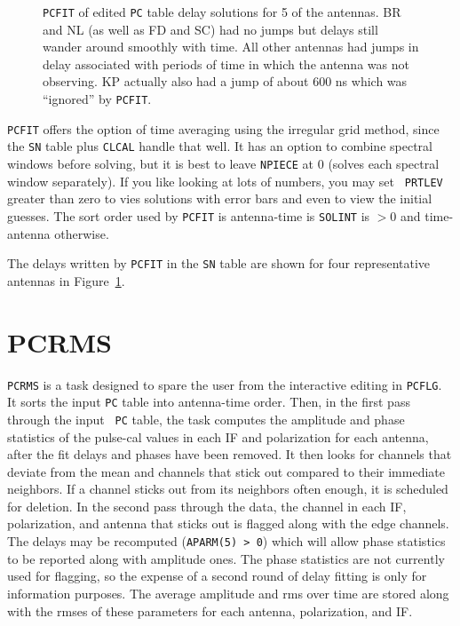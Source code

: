 \documentclass[twoside]{article}
\newcommand{\putfig}[1]{\texttt{[image: \#1.eps]}}
\begin{document}
\begin{figure}
\begin{center}
\resizebox{6.5in}{!}{\putfig{PCFIT}}
\caption{{\tt PCFIT} of edited {\tt PC} table delay solutions for 5 of
  the antennas.  BR and NL (as well as FD and SC) had no jumps but
  delays still wander around smoothly with time.  All other antennas
  had jumps in delay associated with periods of time in which the
  antenna was not observing.  KP actually also had a jump of about 600
  ns which was ``ignored'' by {\tt PCFIT}\@.}
\label{fig:PCFIT}
\end{center}
\end{figure}

{\tt PCFIT} offers the option of time averaging using the irregular
grid method, since the {\tt SN} table plus {\tt CLCAL} handle that
well.  It has an option to combine spectral windows before solving,
but it is best to leave {\tt NPIECE} at 0 (solves each spectral window
separately).  If you like looking at lots of numbers, you may set {\tt
  PRTLEV} greater than zero to vies solutions with error bars and even
to view the initial guesses.  The sort order used by {\tt PCFIT} is
antenna-time is {\tt SOLINT} is $> 0$ and time-antenna otherwise.

The delays written by {\tt PCFIT} in the {\tt SN} table are shown for
four representative antennas in Figure~\ref{fig:PCFIT}.

\section{PCRMS}

{\tt PCRMS} is a task designed to spare the user from the interactive
editing in {\tt PCFLG}\@.  It sorts the input {\tt PC} table into
antenna-time order.  Then, in the first pass through the input {\tt
  PC} table, the task computes the amplitude and phase statistics of
the pulse-cal values in each IF and polarization for each antenna,
after the fit delays and phases have been removed.  It then looks for
channels that deviate from the mean and channels that stick out
compared to their immediate neighbors.  If a channel sticks out from
its neighbors often enough, it is scheduled for deletion.  In the
second pass through the data, the channel in each IF, polarization,
and antenna that sticks out is flagged along with the edge channels.
The delays may be recomputed ({\tt APARM(5) > 0}) which will allow
phase statistics to be reported along with amplitude ones.  The phase
statistics are not currently used for flagging, so the expense of a
second round of delay fitting is only for information purposes.  The
average amplitude and rms over time are stored along with the rmses of
these parameters for each antenna, polarization, and IF\@.
\end{document}

